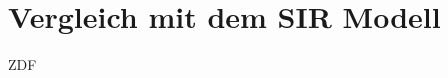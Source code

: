 \documentclass[10pt,twocolumn]{scrartcl}
\begin{document}
%
%
%
%
%
\section*{Vergleich mit dem SIR Modell}
ZDF
\end{document}
